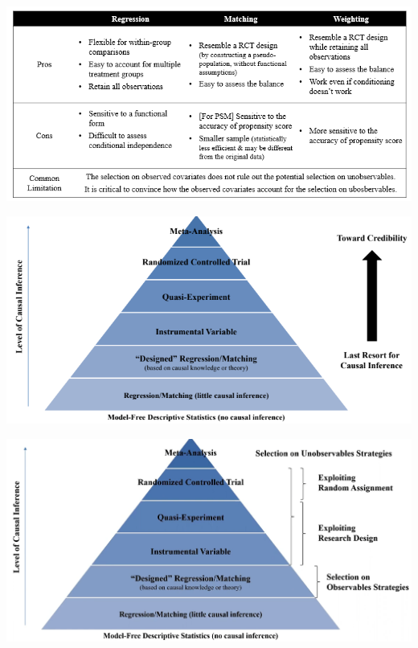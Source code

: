 \documentclass[
]{book}
\theoremstyle{definition}
\theoremstyle{definition}
\theoremstyle{definition}
\theoremstyle{definition}
\theoremstyle{remark}
\begin{document}
\includegraphics{figures/02.png}

\includegraphics{figures/03.png}

\includegraphics{figures/22.png}
\end{document}
